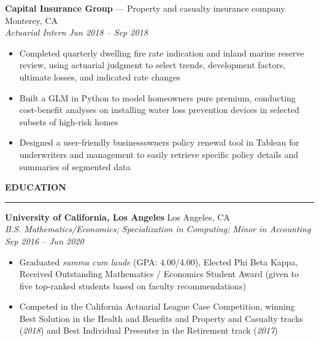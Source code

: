 \documentclass[11pt,letterpaper]{article}
\newcommand{\sectline}{\vspace{5pt}\hrule height 1.5pt\vspace{5pt}}
\newcommand{\sectspace}{\vspace{12pt}}
\newcommand{\smallspace}{\vspace{6pt}}
\begin{document}
\smallspace 
\textbf{Capital Insurance Group} --- Property and casualty insurance company \hfill Monterey, CA \\
\textit{Actuarial Intern} \hfill \textit{Jun 2018 -- Sep 2018}
\begin{itemize}
	\item Completed quarterly dwelling fire rate indication and inland marine reserve review, using actuarial judgment to select trends, development factors, ultimate losses, and indicated rate changes
	\item Built a GLM in Python to model homeowners pure premium, conducting cost-benefit analyses on installing water loss prevention devices in selected subsets of high-risk homes 
	\item Designed a user-friendly businessowners policy renewal tool in Tableau for underwriters and management to easily retrieve specific policy details and summaries of segmented data	
\end{itemize}
\sectspace

\textbf{EDUCATION}\sectline
\textbf{University of California, Los Angeles} \hfill Los Angeles, CA \\
\textit{B.S. Mathematics/Economics; Specialization in Computing; Minor in Accounting} \hfill \textit{Sep 2016 -- Jun 2020}
\begin{itemize}
	\item Graduated \textit{summa cum laude} (GPA: 4.00/4.00), Elected Phi Beta Kappa, Received Outstanding Mathematics / Economics Student Award (given to five  top-ranked students based on faculty recommendations)
	\item Competed in the California Actuarial League Case Competition, winning Best Solution in the Health and Benefits and Property and Casualty tracks (\textit{2018}) and Best Individual Presenter in the Retirement track (\textit{2017})
\end{itemize}
\sectspace
\end{document}
